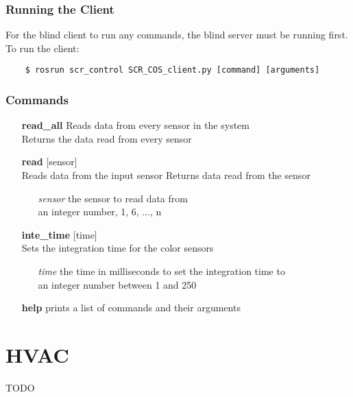 \documentclass[twoside]{article}
\begin{document}
	\subsubsection{Running the Client}
		For the blind client to run any commands, the blind server must be running first.\\
	To run the client:
	\begin{verbatim}
	$ rosrun scr_control SCR_COS_client.py [command] [arguments]
	\end{verbatim}
	\subsubsection{Commands}
	\begin{enumerate}
		\item[\bf read\_all] Reads data from every sensor in the system\\
		Returns the data read from every sensor
		\item[\bf read] [sensor]\\
		Reads data from the input sensor
		Returns data read from the sensor
		\begin{enumerate}[leftmargin=3\parindent]
			\item[\it sensor] the sensor to read data from\\
			an integer number, 1, 6, ..., n
		\end{enumerate}
	\item[\bf inte\_time] [time]\\
	Sets the integration time for the color sensors
	\begin{enumerate}[leftmargin=3\parindent]
		\item[\it time] the time in milliseconds to set the integration time to\\
		an integer number between 1 and 250
	\end{enumerate}
		\item[\bf help] prints a list of commands and their arguments
	\end{enumerate}
	
	\section{HVAC}
	TODO
\end{document}
